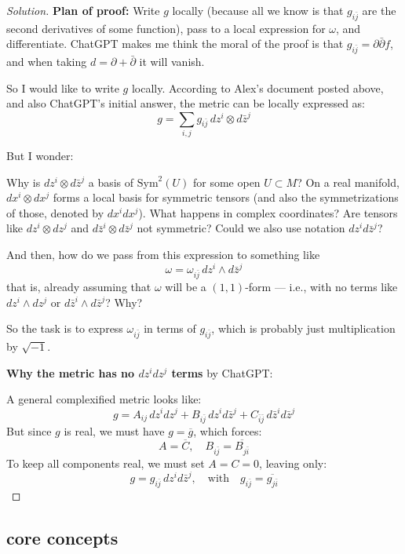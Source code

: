 \begin{proof}[Solution]\leavevmode
\textbf{Plan of proof:} Write \( g \) locally (because all we know is that \( g_{i\bar{j}} \) are the second derivatives of some function), pass to a local expression for \( \omega \), and differentiate. ChatGPT makes me think the moral of the proof is that \( g_{i\bar{j}} = \partial \bar{\partial} f \), and when taking \( d = \partial + \bar{\partial} \) it will vanish.

So I would like to write \( g \) locally. According to Alex’s document posted above, and also ChatGPT’s initial answer, the metric can be locally expressed as:
\[
g = \sum_{i,j} g_{i \bar{j}} \, dz^i \otimes d\bar{z}^j
\]

But I wonder:

Why is \( dz^i \otimes d\bar{z}^j \) a basis of \( \mathrm{Sym}^2(U) \) for some open \( U \subset M \)? On a real manifold, \( dx^i \otimes dx^j \) forms a local basis for symmetric tensors (and also the symmetrizations of those, denoted by \( dx^i dx^j \)). What happens in complex coordinates? Are tensors like \( dz^i \otimes dz^j \) and \( d\bar{z}^i \otimes d\bar{z}^j \) not symmetric? Could we also use notation \( dz^i d\bar{z}^j \)?

And then, how do we pass from this expression to something like
\[
\omega = \omega_{i \bar{j}} \, dz^i \wedge d\bar{z}^j
\]
that is, already assuming that \( \omega \) will be a \((1,1)\)-form — i.e., with no terms like \( dz^i \wedge dz^j \) or \( d\bar{z}^i \wedge d\bar{z}^j \)? Why?

So the task is to express \( \omega_{i \bar{j}} \) in terms of \( g_{i \bar{j}} \), which is probably just multiplication by \( \sqrt{-1} \).

\bigskip

\textbf{Why the metric has no \( dz^i dz^j \) terms} by ChatGPT:

A general complexified metric looks like:
\[
g = A_{ij} \, dz^i dz^j + B_{i\bar{j}} \, dz^i d\bar{z}^j + C_{\bar{i} \bar{j}} \, d\bar{z}^i d\bar{z}^j
\]
But since \( g \) is real, we must have \( g = \overline{g} \), which forces:
\[
A = \overline{C}, \quad B_{i\bar{j}} = \overline{B_{j\bar{i}}}
\]
To keep all components real, we must set \( A = C = 0 \), leaving only:
\[
g = g_{i\bar{j}} \, dz^i d\bar{z}^j, \quad \text{with} \quad g_{i\bar{j}} = \overline{g_{j\bar{i}}}
\]
\end{proof}

\subsection{core concepts}


